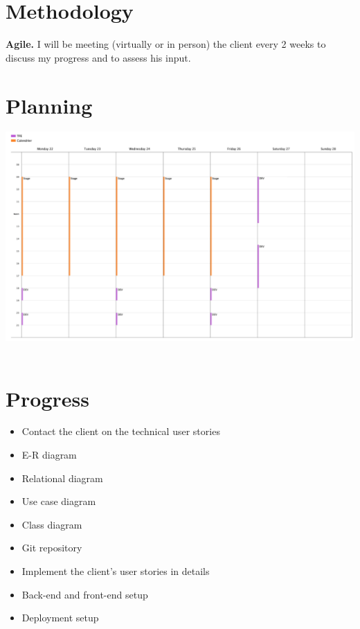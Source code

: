 \documentclass{article}
\begin{document}
\section{Methodology}

    \textbf{Agile.} I will be meeting (virtually or in person) the client every 2 weeks to discuss my progress and to assess his input. 

\section{Planning}

    \includegraphics[width=1.2\textwidth]{planning.PNG}~\\[0.2cm]

\pagebreak

\section{Progress}

    \begin{itemize}
        
        \item Contact the client on the technical user stories
        \item E-R diagram
        \item Relational diagram
        \item Use case diagram 
        \item Class diagram
        \item Git repository
        \item Implement the client's user stories in details 
        \item Back-end and front-end setup
        \item Deployment setup 

    \end{itemize}
        
\end{document}
